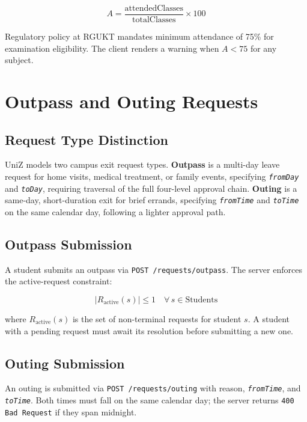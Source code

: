 \documentclass[12pt,a4paper]{report}
\newcommand{\api}[1]{\texttt{\small #1}}
\newcommand{\field}[1]{\texttt{\textit{#1}}}
\newcommand{\code}[1]{\texttt{#1}}
\begin{document}
\begin{equation}
  A = \frac{\text{attendedClasses}}{\text{totalClasses}} \times 100
  \label{eq:attendance}
\end{equation}

Regulatory policy at RGUKT mandates minimum attendance of 75\% for examination eligibility. The client renders a warning when $A < 75$ for any subject.

\section{Outpass and Outing Requests}

\subsection{Request Type Distinction}

UniZ models two campus exit request types. \textbf{Outpass} is a multi-day leave request for home visits, medical treatment, or family events, specifying \field{fromDay} and \field{toDay}, requiring traversal of the full four-level approval chain. \textbf{Outing} is a same-day, short-duration exit for brief errands, specifying \field{fromTime} and \field{toTime} on the same calendar day, following a lighter approval path.

\subsection{Outpass Submission}

A student submits an outpass via \api{POST /requests/outpass}. The server enforces the active-request constraint:

\begin{equation}
  |R_{\text{active}}(s)| \leq 1 \quad \forall\, s \in \text{Students}
  \label{eq:constraint}
\end{equation}

where $R_{\text{active}}(s)$ is the set of non-terminal requests for student $s$. A student with a pending request must await its resolution before submitting a new one.

\subsection{Outing Submission}

An outing is submitted via \api{POST /requests/outing} with reason, \field{fromTime}, and \field{toTime}. Both times must fall on the same calendar day; the server returns \code{400 Bad Request} if they span midnight.
\end{document}
